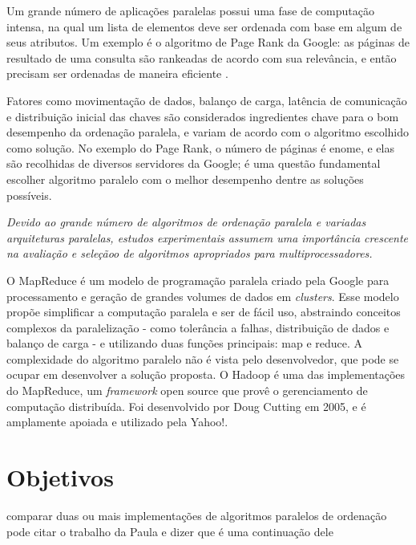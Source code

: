 
Um grande número de aplicações paralelas possui uma fase de computação intensa, na qual um lista de elementos deve ser ordenada com base em algum de seus atributos. Um exemplo é o algoritmo de Page Rank \cite{PageRank:1999} da Google: as páginas de resultado de uma consulta são rankeadas de acordo com sua relevância, e então precisam ser ordenadas de maneira eficiente \cite{Kale:2010}.

Fatores como movimentação de dados, balanço de carga, latência de comunicação e distribuição inicial das chaves são considerados ingredientes chave para o bom desempenho da ordenação paralela, e variam de acordo com o algoritmo escolhido como solução\cite{Kale:2010}. 
No exemplo do Page Rank, o número de páginas é enome, e elas são recolhidas de diversos servidores da Google; é uma questão fundamental escolher algoritmo paralelo com o melhor desempenho dentre as soluções possíveis.

\textit{Devido ao grande número de algoritmos de ordenação paralela e variadas arquiteturas paralelas, estudos experimentais assumem uma importância crescente na avaliação e seleçãoo de algoritmos apropriados para multiprocessadores.}


O MapReduce\cite{Dean:2008}  é um modelo de programação paralela criado pela Google para processamento e geração de grandes volumes de dados em \textit{clusters}. Esse modelo propõe simplificar a computação paralela e ser de fácil uso, abstraindo conceitos complexos da paralelização - como tolerância a falhas, distribuição de dados e balanço de carga - e utilizando duas funções principais: map e reduce. A complexidade do algoritmo paralelo não é vista pelo desenvolvedor, que pode se ocupar em desenvolver a solução proposta. O Hadoop \cite{Hadoop:2010} é uma das implementações do MapReduce, um \textit{framework} open source que provê o gerenciamento de computação distribuída. Foi desenvolvido por Doug Cutting em 2005, e é amplamente apoiada e utilizado pela Yahoo!.




\section{Objetivos}

comparar duas ou mais implementações de algoritmos paralelos de ordenação
pode citar o trabalho da Paula e dizer que é uma continuação dele

